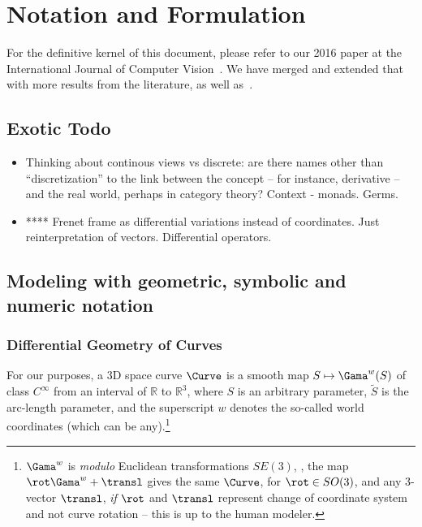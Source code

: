 \mynewpage
\chapter{Notation and Formulation}\label{sec:notation}
For the definitive kernel of this document, please refer to our 2016 paper at
the International Journal of Computer Vision~\cite{Fabbri:Kimia:IJCV2016}.
We have merged and extended that with more results from the literature,
as well as~\cite{Fabbri:PhD:2010}.

\section{Exotic Todo}
\begin{itemize}
\item Thinking about continous views vs discrete: are there names other than
  ``discretization'' to the link between the concept -- for instance, derivative
  -- and the real world, perhaps in category theory? Context - monads. Germs.
\item **** Frenet frame as differential variations instead of coordinates. Just
  reinterpretation of vectors. Differential operators.
\end{itemize}

\section{Modeling with geometric, symbolic and numeric notation}



\subsection{Differential Geometry of Curves}
For our purposes, a 3D space curve $\Curve$ is a smooth map $S \mapsto
\Gama^w(S)$ of class $C^\infty$ from an interval
of $\mathbb{R}$
to $\mathbb{R}^3$, where $S$ is an arbitrary parameter,
$\tilde S$ is the arc-length parameter, and the superscript
$w$ denotes the so-called world coordinates (which can be any).\footnote{$\Gama^w$ is \emph{modulo}
Euclidean transformations $SE(3)$, \ie, the map $\rot\Gama^w + \transl$ gives
the same $\Curve$, for $\rot \in SO(3)$, and any 3-vector $\transl$,
\emph{if} $\rot$ and $\transl$ represent change of coordinate system and not
curve rotation -- this is up to the human modeler.}

